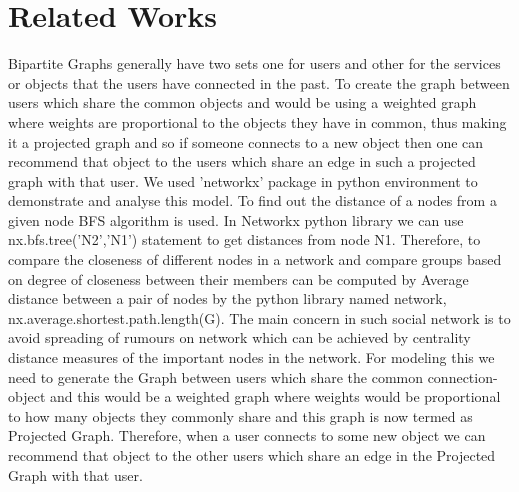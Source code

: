 \documentclass{article}
\begin{document}
\newpage
\newpage

\section{Related Works}
Bipartite Graphs generally have two sets one for users and other for the services or objects that the users have connected in the past. To create the graph between users which share the common objects and would be using a weighted graph where weights are proportional to the objects they have in common, thus making it a projected graph and so if someone connects to a new object then one can recommend that object to the users which share an edge in such a projected graph with that user.
\newline
We used 'networkx' package in python environment to demonstrate and analyse this model.
To find out the distance of a nodes from a given node BFS algorithm is used. In Networkx python library we can use nx.bfs.tree('N2',’N1’) statement to get distances from node N1.
\newline
Therefore, to compare the closeness of different nodes in a network and compare groups based on degree of closeness between their members can be computed by Average distance between a pair of nodes by the python library named network, nx.average.shortest.path.length(G).
\newline
The main concern in such social network is to avoid spreading of rumours on network which can be achieved by centrality distance measures of the important nodes in the network.
\newline
For modeling this we need to generate the Graph between users which share the common connection-object and this would be a weighted graph where weights would be proportional to how many objects they commonly share and this graph is now termed as Projected Graph. Therefore, when a user connects to some new object we can recommend that object to the other users which share an edge in the Projected Graph with that user.

\newpage
\end{document}
